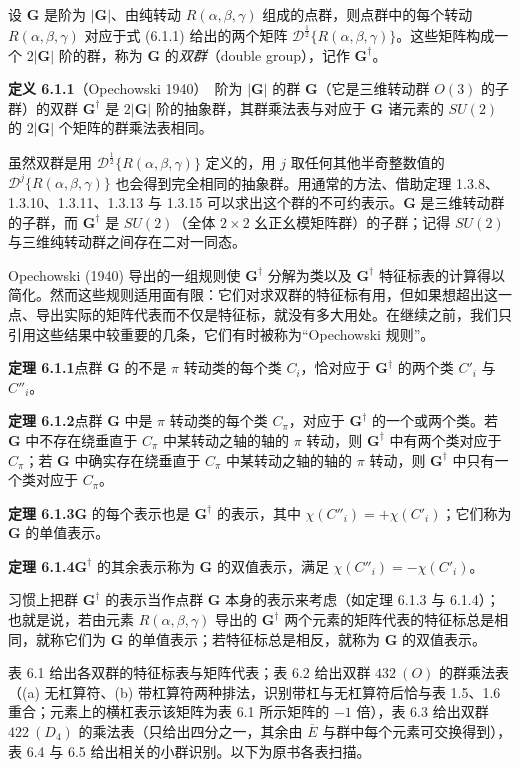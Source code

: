 设 $\mathbf{G}$ 是阶为 $|\mathbf{G}|$、由纯转动 $R(\alpha, \beta, \gamma)$ 组成的点群，则点群中的每个转动 $R(\alpha, \beta, \gamma)$ 对应于式 (6.1.1) 给出的两个矩阵 $\mathcal{D}^{\frac{1}{2}}\{R(\alpha, \beta, \gamma)\}$。这些矩阵构成一个 $2|\mathbf{G}|$ 阶的群，称为 $\mathbf{G}$ 的\textit{双群}（double group），记作 $\mathbf{G}^{\dagger}$。

\noindent\textbf{定义 6.1.1}\quad （Opechowski 1940）\ 阶为 $|\mathbf{G}|$ 的群 $\mathbf{G}$（它是三维转动群 $O(3)$ 的子群）的双群 $\mathbf{G}^{\dagger}$ 是 $2|\mathbf{G}|$ 阶的抽象群，其群乘法表与对应于 $\mathbf{G}$ 诸元素的 $SU(2)$ 的 $2|\mathbf{G}|$ 个矩阵的群乘法表相同。

虽然双群是用 $\mathcal{D}^{\frac{1}{2}}\{R(\alpha, \beta, \gamma)\}$ 定义的，用 $j$ 取任何其他半奇整数值的 $\mathcal{D}^{j}\{R(\alpha, \beta, \gamma)\}$ 也会得到完全相同的抽象群。用通常的方法、借助定理 1.3.8、1.3.10、1.3.11、1.3.13 与 1.3.15 可以求出这个群的不可约表示。$\mathbf{G}$ 是三维转动群的子群，而 $\mathbf{G}^{\dagger}$ 是 $SU(2)$（全体 $2\times2$ 幺正幺模矩阵群）的子群；记得 $SU(2)$ 与三维纯转动群之间存在二对一同态。

Opechowski (1940) 导出的一组规则使 $\mathbf{G}^{\dagger}$ 分解为类以及 $\mathbf{G}^{\dagger}$ 特征标表的计算得以简化。然而这些规则适用面有限：它们对求双群的特征标有用，但如果想超出这一点、导出实际的矩阵代表而不仅是特征标，就没有多大用处。在继续之前，我们只引用这些结果中较重要的几条，它们有时被称为“Opechowski 规则”。

\noindent\textbf{定理 6.1.1}\quad 点群 $\mathbf{G}$ 的不是 $\pi$ 转动类的每个类 $C_{i}$，恰对应于 $\mathbf{G}^{\dagger}$ 的两个类 $C'_{i}$ 与 $C''_{i}$。

\noindent\textbf{定理 6.1.2}\quad 点群 $\mathbf{G}$ 中是 $\pi$ 转动类的每个类 $C_{\pi}$，对应于 $\mathbf{G}^{\dagger}$ 的一个或两个类。若 $\mathbf{G}$ 中不存在绕垂直于 $C_{\pi}$ 中某转动之轴的轴的 $\pi$ 转动，则 $\mathbf{G}^{\dagger}$ 中有两个类对应于 $C_{\pi}$；若 $\mathbf{G}$ 中确实存在绕垂直于 $C_{\pi}$ 中某转动之轴的轴的 $\pi$ 转动，则 $\mathbf{G}^{\dagger}$ 中只有一个类对应于 $C_{\pi}$。

\noindent\textbf{定理 6.1.3}\quad $\mathbf{G}$ 的每个表示也是 $\mathbf{G}^{\dagger}$ 的表示，其中 $\chi(C''_{i}) = +\chi(C'_{i})$；它们称为 $\mathbf{G}$ 的单值表示。

\noindent\textbf{定理 6.1.4}\quad $\mathbf{G}^{\dagger}$ 的其余表示称为 $\mathbf{G}$ 的双值表示，满足 $\chi(C''_{i}) = -\chi(C'_{i})$。

习惯上把群 $\mathbf{G}^{\dagger}$ 的表示当作点群 $\mathbf{G}$ 本身的表示来考虑（如定理 6.1.3 与 6.1.4）；也就是说，若由元素 $R(\alpha, \beta, \gamma)$ 导出的 $\mathbf{G}^{\dagger}$ 两个元素的矩阵代表的特征标总是相同，就称它们为 $\mathbf{G}$ 的单值表示；若特征标总是相反，就称为 $\mathbf{G}$ 的双值表示。

表 6.1 给出各双群的特征标表与矩阵代表；表 6.2 给出双群 $432\ (O)$ 的群乘法表（(a) 无杠算符、(b) 带杠算符两种排法，识别带杠与无杠算符后恰与表 1.5、1.6 重合；元素上的横杠表示该矩阵为表 6.1 所示矩阵的 $-1$ 倍），表 6.3 给出双群 $422\ (D_{4})$ 的乘法表（只给出四分之一，其余由 $\overline{E}$ 与群中每个元素可交换得到），表 6.4 与 6.5 给出相关的小群识别。以下为原书各表扫描。


